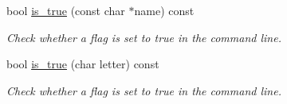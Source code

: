 {\bf }\par
\begin{DoxyCompactItemize}
\item 
bool \hyperlink{class_anyarg_a185d6b303115e47fac952d2499cdf548}{is\+\_\+true} (const char $\ast$name) const 
\begin{DoxyCompactList}\small\item\em Check whether a flag is set to true in the command line. \end{DoxyCompactList}\item 
bool \hyperlink{class_anyarg_a5a3e219f85a0dea283876ece00287751}{is\+\_\+true} (char letter) const 
\begin{DoxyCompactList}\small\item\em Check whether a flag is set to true in the command line. \end{DoxyCompactList}\end{DoxyCompactItemize}

